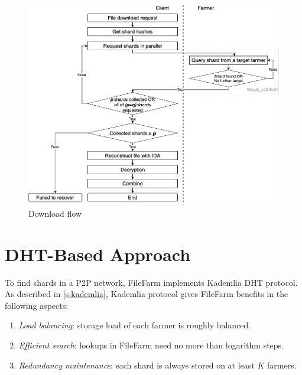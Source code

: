 \begin{figure}[!b]
\centering
  \includegraphics[width=15cm]{figures/download_flow.png}
  \caption{Download flow}
  \label{fig:downloadflow}
\end{figure}

\newpage

\section{DHT-Based Approach}
\label{s:dhtbasedapproach}

To find shards in a P2P network, FileFarm implements Kademlia DHT protocol. As described in \ref{s:kademlia}, Kademlia protocol gives FileFarm benefits in the following aspects:

\begin{enumerate}
  \item \textit{Load balancing}: storage load of each farmer is roughly balanced.
  \item \textit{Efficient search}: lookups in FileFarm need no more than logarithm steps.
  \item \textit{Redundancy maintenance}: each shard is always stored on at least $K$ farmers.
\end{enumerate}

